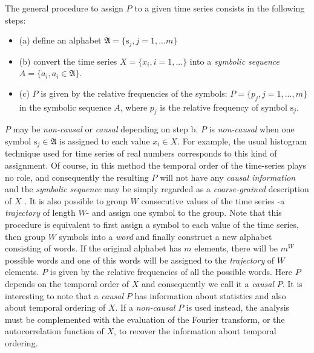 The general procedure to assign $P$ to a given time series consists in the following steps:
\begin{itemize}
\item (a) define an alphabet $\mathfrak A=\{\mathrm{s}_j, j=1,...m\}$ 
\item \label{list:pdf} (b) convert the time series $X=\{x_i, i=1,...\}$ into a \emph{symbolic sequence} $A=\{a_i, a_i\in \mathfrak A\}$. 
\item (c) $P$ is given by the relative frequencies of the symbols: $P=\{p_j, j=1,...,m\}$ in the symbolic sequence $A$, where $p_j$ is the relative frequency of symbol ${\mathrm{s}_j}$. 
\end{itemize}
%
$P$ may be \emph{non-causal} or \emph{causal} \cite{DeMicco2008} depending on step b. $P$ is \emph{non-causal} when one symbol $\mathrm{s}_j\in \mathfrak A$ is assigned to each value $x_i\in X$. For example, the usual histogram technique used for time series of real numbers corresponds to this kind of assignment. Of course, in this method the temporal order of the time-series plays no role, and consequently the resulting $P$ will not have any \emph{causal information} and the \emph{symbolic sequence} may be simply regarded as a \emph{coarse-grained} description of $X$ \cite{DeMicco2008}. It is also possible to group $W$ consecutive values of the time series -a \emph{trajectory} of length $W$- and assign one symbol to the group. Note that this procedure is equivalent to first assign a symbol to each value of the time series, then group $W$ symbols into a \emph{word} and finally construct a new alphabet consisting of words. If the original alphabet has $m$ elements, there will be $m^W$ possible words and one of this words will be assigned to the \emph{trajectory} of $W$ elements. $P$ is given by the relative frequencies of all the possible words. Here $P$ depends on the temporal order of $X$ and consequently we call it a \emph{causal} $P$. It is interesting to note that a \emph{causal} $P$ has information about statistics and also about temporal ordering of $X$. If a \emph{non-causal} $P$ is used instead, the analysis must be complemented with the evaluation of the Fourier transform, or the autocorrelation function of $X$, to recover the information about temporal ordering.

